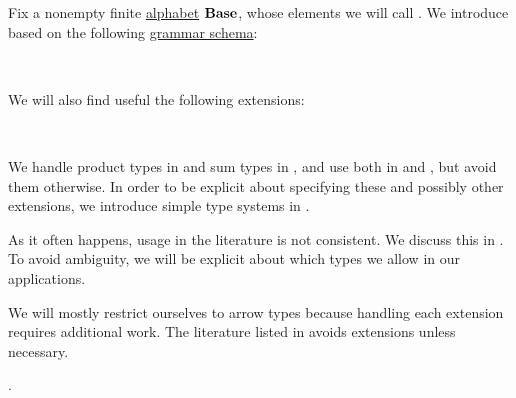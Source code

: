 \begin{definition}\label{def:simple_type}\mimprovised
  Fix a nonempty finite \hyperref[def:formal_language/alphabet]{alphabet} \( \op*{Base} \), whose elements we will call . We introduce  based on the following \hyperref[def:formal_grammar/schema]{grammar schema}:
  \begin{bnf*}
       {\bnftsq{(} \bnfsp {} \bnfsp \bnftsq{\( \synimplies \)} \bnfsp {} \bnfsp \bnftsq{)}} \\
             { \bnfor {}}
  \end{bnf*}

  We will also find useful the following extensions:
  \begin{bnf*}
     {\bnftsq{(} \bnfsp {} \bnfsp \bnftsq{\( \syntimes \)} \bnfsp {} \bnfsp \bnftsq{)}} \\
         {\bnftsq{(} \bnfsp {} \bnfsp \bnftsq{\( \synplus \)} \bnfsp {} \bnfsp \bnftsq{)}}
  \end{bnf*}

  We handle product types in  and sum types in , and use both in  and , but avoid them otherwise. In order to be explicit about specifying these and possibly other extensions, we introduce simple type systems in .
\end{definition}
\begin{comments}
  \item As it often happens, usage in the literature is not consistent. We discuss this in . To avoid ambiguity, we will be explicit about which types we allow in our applications.

  \item We will mostly restrict ourselves to arrow types because handling each extension requires additional work. The literature listed in  avoids extensions unless necessary.

  \item {}.
\end{comments}

